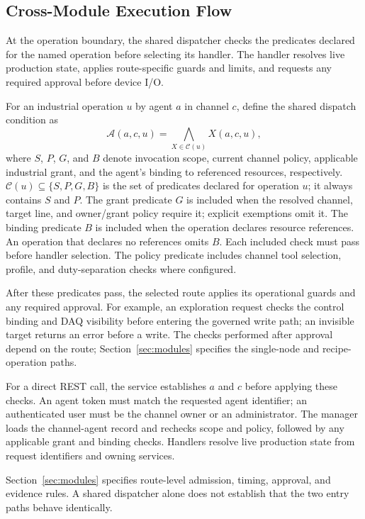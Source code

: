 \subsection{Cross-Module Execution Flow}
\label{sec:executionflow}
At the operation boundary, the shared dispatcher checks the predicates
declared for the named operation before selecting its handler. The handler
resolves live production state, applies route-specific guards and limits, and
requests any required approval before device I/O.

For an industrial operation $u$ by agent $a$ in channel $c$, define the
shared dispatch condition as
\begin{equation}
\mathcal{A}(a,c,u)=\bigwedge_{X\in\mathcal{C}(u)}X(a,c,u),
\label{eq:dispatch-contract}
\end{equation}
where $S$, $P$, $G$, and $B$ denote invocation scope, current channel policy,
applicable industrial grant, and the agent's binding to referenced resources,
respectively. $\mathcal{C}(u)\subseteq\{S,P,G,B\}$ is the set of predicates
declared for operation $u$; it always contains $S$ and $P$. The grant predicate
$G$ is included when the resolved channel, target line, and owner/grant policy
require it; explicit exemptions omit it. The binding predicate $B$ is included
when the operation declares resource references. An operation that declares
no references omits $B$. Each included check must pass before handler
selection. The policy predicate includes channel tool selection, profile, and duty-separation checks where
configured.

After these predicates pass, the selected route applies its operational
guards and any required approval. For example, an exploration request checks
the control binding and DAQ visibility before entering the governed write
path; an invisible target returns an error before a write. The checks performed
after approval depend on the route; Section~\ref{sec:modules} specifies the
single-node and recipe-operation paths.

For a direct REST call, the service establishes $a$ and $c$ before applying
these checks. An agent token must match the requested agent identifier; an
authenticated user must be the channel owner or an administrator. The manager
loads the channel-agent record and rechecks scope and policy, followed by any
applicable grant and binding checks. Handlers resolve live production state
from request identifiers and owning services.

Section~\ref{sec:modules} specifies route-level admission, timing, approval,
and evidence rules. A shared dispatcher alone does not establish that the two
entry paths behave identically.


